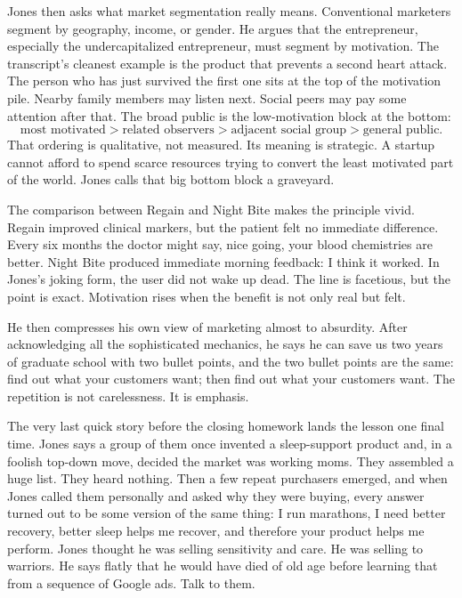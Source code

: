 Jones then asks what market segmentation really means. Conventional marketers segment by geography, income, or gender. He argues that the entrepreneur, especially the undercapitalized entrepreneur, must segment by motivation. The transcript's cleanest example is the product that prevents a second heart attack. The person who has just survived the first one sits at the top of the motivation pile. Nearby family members may listen next. Social peers may pay some attention after that. The broad public is the low-motivation block at the bottom:
\begin{equation}
\text{most motivated}
>
\text{related observers}
>
\text{adjacent social group}
>
\text{general public}.
\end{equation}
That ordering is qualitative, not measured. Its meaning is strategic. A startup cannot afford to spend scarce resources trying to convert the least motivated part of the world. Jones calls that big bottom block a graveyard.

The comparison between Regain and Night Bite makes the principle vivid. Regain improved clinical markers, but the patient felt no immediate difference. Every six months the doctor might say, nice going, your blood chemistries are better. Night Bite produced immediate morning feedback: I think it worked. In Jones's joking form, the user did not wake up dead. The line is facetious, but the point is exact. Motivation rises when the benefit is not only real but felt.

He then compresses his own view of marketing almost to absurdity. After acknowledging all the sophisticated mechanics, he says he can save us two years of graduate school with two bullet points, and the two bullet points are the same: find out what your customers want; then find out what your customers want. The repetition is not carelessness. It is emphasis.

The very last quick story before the closing homework lands the lesson one final time. Jones says a group of them once invented a sleep-support product and, in a foolish top-down move, decided the market was working moms. They assembled a huge list. They heard nothing. Then a few repeat purchasers emerged, and when Jones called them personally and asked why they were buying, every answer turned out to be some version of the same thing: I run marathons, I need better recovery, better sleep helps me recover, and therefore your product helps me perform. Jones thought he was selling sensitivity and care. He was selling to warriors. He says flatly that he would have died of old age before learning that from a sequence of Google ads. Talk to them.

